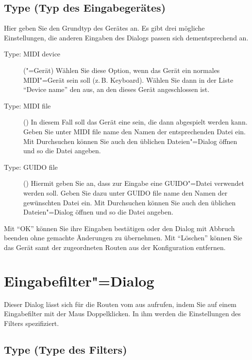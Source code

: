 \subsection{Type (Typ des Eingabegerätes)}


Hier geben Sie den Grundtyp des Gerätes an. Es gibt drei mögliche 
Einstellungen, die anderen Eingaben des Dialogs passen sich dementsprechend 
an.

\begin{description}
\item[Type: MIDI device] ("=Gerät)
  Wählen Sie diese Option, wenn das Gerät ein normales MIDI"=Gerät
  sein soll (z.\,B. Keyboard). Wählen Sie dann in der Liste "`Device
  name"' den  aus, an den dieses
  Gerät angeschlossen ist.

\item[Type: MIDI file] ()
  In diesem Fall soll das Gerät eine
   sein, die dann abgespielt
  werden kann. Geben Sie unter MIDI file name den Namen der
  entsprechenden Datei ein. Mit Durchsuchen können Sie auch den
  üblichen Dateien"=Dialog öffnen und so die Datei angeben.

\item[Type: GUIDO file] () Hiermit
  geben Sie an, dass zur Eingabe eine GUIDO"=Datei verwendet werden
  soll. Geben Sie dazu unter GUIDO file name den Namen der gewünschten
  Datei ein. Mit Durchsuchen können Sie auch den üblichen
  Dateien"=Dialog öffnen und so die Datei angeben.
\end{description}


Mit "`OK"' können Sie ihre Eingaben bestätigen oder den Dialog mit Abbruch
beenden ohne gemachte Änderungen zu übernehmen.  Mit "`Löschen"'
können Sie das Gerät samt der zugeordneten Routen aus der
Konfiguration entfernen.

\section{Eingabefilter"=Dialog}\label{sec:DE_R1}
Dieser Dialog lässt sich für die Routen vom
 aus aufrufen, indem Sie auf
einem Eingabefilter mit der Maus Doppelklicken. In ihm werden die
Einstellungen des Filters spezifiziert.

\subsection{Type (Type des Filters)}


